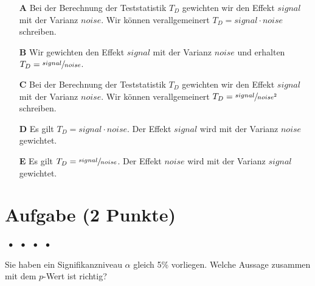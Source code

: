 \documentclass[a4paper, 9pt]{scrartcl}\usepackage[]{graphicx}\usepackage[]{xcolor}
\begin{document}
\begin{enumerate}
\item [\textbf{A} \msquare] Bei der Berechnung der Teststatistik $T_D$ gewichten wir den Effekt $signal$ mit der Varianz $noise$. Wir können verallgemeinert $T_D = signal \cdot noise$ schreiben.
\item [\textbf{B} \msquare] Wir gewichten den Effekt $signal$ mit der Varianz $noise$ und erhalten $T_D = \sfrac{signal}{noise}$.
\item [\textbf{C} \msquare] Bei der Berechnung der Teststatistik $T_D$ gewichten wir den Effekt $signal$ mit der Varianz $noise$. Wir können verallgemeinert $T_D = \sfrac{signal}{noise^2}$ schreiben.
\item [\textbf{D} \msquare] Es gilt $T_D = signal \cdot noise$. Der Effekt $signal$ wird mit der Varianz $noise$ gewichtet.
\item [\textbf{E} \msquare] Es gilt $T_D = \sfrac{signal}{noise}$. Der Effekt $noise$ wird mit der Varianz $signal$ gewichtet.
\end{enumerate}


\section{Aufgabe \hfill (2 Punkte)}

\ifcollection
\begin{flushright}
\tiny\vspace{-2Ex}
\textbf{\examinhaltstart}
\exammodulemathstat $\;\bullet$
\exammodulestat $\;\bullet$
\exammodulestatbbv $\;\bullet$
\exammodulestatversuch $\;\bullet$
\exammodulebiostat
\vspace{-1Ex}
\end{flushright}
\fi




Sie haben ein Signifikanzniveau $\alpha$ gleich 5\% vorliegen. Welche Aussage zusammen mit dem $p$-Wert ist richtig?
\end{document}
